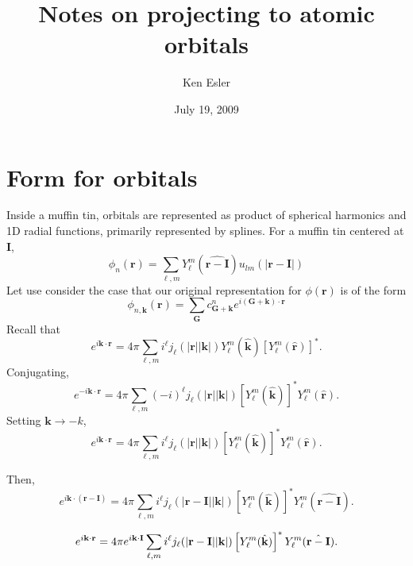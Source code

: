 \documentclass{article}
\title{Notes on projecting to atomic orbitals}
\author{Ken Esler}
\date{July 19, 2009}
\begin{document}
\maketitle
\newcommand{\vr}{\mathbf{r}}
\newcommand{\vI}{\mathbf{I}}
\newcommand{\vk}{\mathbf{k}}
\newcommand{\vG}{\mathbf{G}}
\section{Form for orbitals}
Inside a muffin tin, orbitals are represented as product of spherical
harmonics and 1D radial functions, primarily represented by splines.
For a muffin tin centered at $\vI$, 
\begin{equation}
\phi_n(\vr) = \sum_{\ell,m} Y_\ell^m(\hat{\vr -\vI})
u_{lm}\left(\left|\vr - \vI\right|\right) \label{eq:ulm}
\end{equation}
Let use consider the case that our original representation for
$\phi(\vr)$ is of the form
\begin{equation}
\phi_{n,\vk}(\vr) = \sum_\vG c_{\vG+\vk}^n e^{i(\vG + \vk)\cdot \vr}
\end{equation}
Recall that
\begin{equation}
e^{i\vk\cdot\vr} = 4\pi \sum_{\ell,m} i^\ell j_\ell(|\vr||\vk|)
Y_\ell^m(\hat{\vk}) \left[Y_\ell^m(\hat{\vr})\right]^*.
\end{equation}
Conjugating,
\begin{equation}
e^{-i\vk\cdot\vr} = 4\pi\sum_{\ell,m} (-i)^\ell j_\ell(|\vr||\vk|)
\left[Y_\ell^m(\hat{\vk})\right]^* Y_\ell^m(\hat{\vr}).
\end{equation}
Setting $\vk \rightarrow -k$,
\begin{equation}
e^{i\vk\cdot\vr} = 4\pi\sum_{\ell,m} i^\ell j_\ell(|\vr||\vk|)
\left[Y_\ell^m(\hat{\vk})\right]^* Y_\ell^m(\hat{\vr}).
\end{equation}

Then,
\begin{equation}
e^{i\vk\cdot(\vr-\vI)} = 4\pi\sum_{\ell,m} i^\ell j_\ell(|\vr-\vI||\vk|)
\left[Y_\ell^m(\hat{\vk})\right]^* Y_\ell^m(\hat{\vr-\vI}).
\end{equation}

\begin{equation}
e^{i\vk\cdot\vr} = 4\pi e^{i\vk\cdot\vI} \-\sum_{\ell,m} i^\ell j_\ell(|\vr-\vI||\vk|)
\left[Y_\ell^m(\hat{\vk})\right]^* Y_\ell^m(\hat{\vr-\vI}).
\end{equation}
\end{document}
